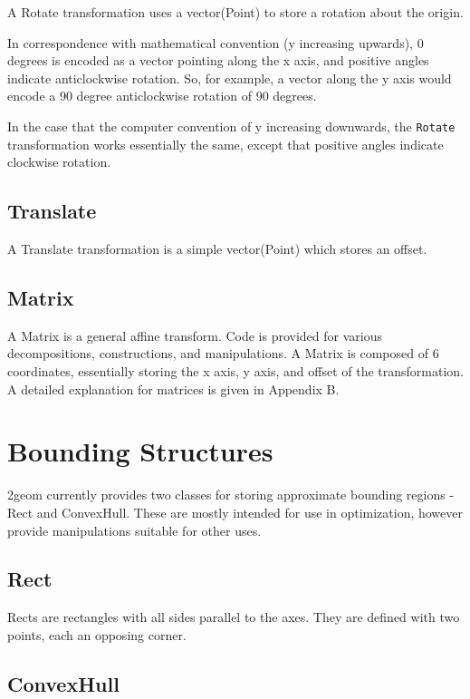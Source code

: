 \documentclass{book}
\newcommand{\code}[1]{\textsf{#1}}
\begin{document}
A \code{Rotate} transformation uses a vector(\code{Point}) to store
a rotation about the origin.

In correspondence with mathematical convention (y increasing upwards),
0 degrees is encoded as a vector pointing along the x axis, and positive
angles indicate anticlockwise rotation.  So, for example, a vector along
the y axis would encode a 90 degree anticlockwise rotation of 90 degrees.

In the case that the computer convention of y increasing downwards,
the \verb}Rotate} transformation works essentially the same, except
that positive angles indicate clockwise rotation.

\subsection{Translate}

A \code{Translate} transformation is a simple vector(\code{Point})
which stores an offset.

\subsection{Matrix}

A \code{Matrix} is a general affine transform.  Code is provided for
various decompositions, constructions, and manipulations.  A
\code{Matrix} is composed of 6 coordinates, essentially storing the
x axis, y axis, and offset of the transformation.  A detailed
explanation for matrices is given in Appendix B.

\section{Bounding Structures}

2geom currently provides two classes for storing approximate bounding
regions - \code{Rect} and \code{ConvexHull}.  These are mostly intended
for use in optimization, however provide manipulations suitable for
other uses.

\subsection{Rect}

\code{Rect}s are rectangles with all sides parallel to the axes. They
are defined with two points, each an opposing corner.

\subsection{ConvexHull}
\end{document}
